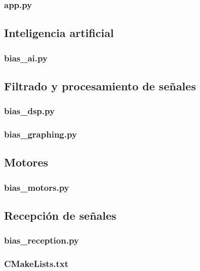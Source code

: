 \documentclass{article}
\begin{document}
\subsubsection{app.py}

\subsection{Inteligencia artificial}

\subsubsection{bias\_ai.py}

\subsection{Filtrado y procesamiento de señales}

\subsubsection{bias\_dsp.py}

\subsubsection{bias\_graphing.py} 


\subsection{Motores}

\subsubsection{bias\_motors.py}


\subsection{Recepción de señales}

\subsubsection{bias\_reception.py}



\subsubsection{CMakeLists.txt}
\end{document}
